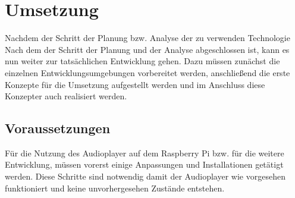 
\chapter{Umsetzung}

Nachdem der Schritt der Planung bzw. Analyse der zu verwenden Technologie
Nach dem der Schritt der Planung und der Analyse abgeschlossen ist, kann es nun
weiter zur tatsächlichen Entwicklung gehen. Dazu müssen zunächst die einzelnen
Entwicklungsumgebungen vorbereitet werden, anschließend die erste Konzepte für
die Umsetzung aufgestellt werden und im Anschluss diese Konzepter auch
realisiert werden.


\section{Voraussetzungen}
Für die Nutzung des Audioplayer auf dem Raspberry Pi bzw. für die weitere
Entwicklung, müssen vorerst einige Anpassungen und Installationen getätigt
werden. Diese Schritte sind notwendig damit der Audioplayer wie vorgesehen
funktioniert und keine unvorhergesehen Zustände entstehen.

